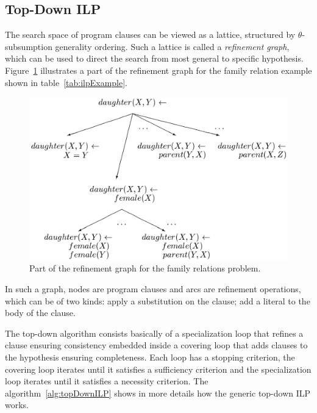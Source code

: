 \subsection{Top-Down ILP}

The search space of program clauses can be viewed as a lattice, structured by $\theta$-subsumption generality
ordering. Such a lattice is called a \emph{refinement graph}, which can be used to direct the search from most general
to specific hypothesis. Figure~\ref{fig:refinementGraph} illustrates a part of the refinement graph for the
family relation example shown in table~\ref{tab:ilpExample}.

\begin{figure}[h!]
\begin{center}
  \includegraphics[width=0.7\linewidth]{./Figures/refinementGraph.png}
\end{center}
\caption{Part of the refinement graph for the family relations problem\citep{DBLP:journals/ml/LavracD96}.}
\label{fig:refinementGraph}
\end{figure}

In such a graph, nodes are program clauses and arcs are refinement operations, which can be of two kinds: apply
a substitution on the clause; add a literal to the body of the clause.

The top-down algorithm consists basically of a specialization loop that refines a clause ensuring consistency
embedded inside a covering loop that adds clauses to the hypothesis ensuring completeness. Each loop has a stopping
criterion, the covering loop iterates until it satisfies a sufficiency criterion and the specialization loop iterates
until it satisfies a necessity criterion. The algorithm~\ref{alg:topDownILP} shows in more details how the generic
top-down ILP works.

